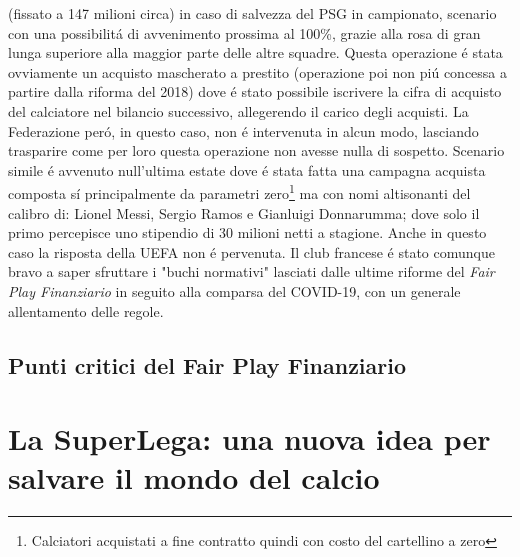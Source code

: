 \documentclass[
    corpo=12pt,
    oneside,
    evenboxes,
    tipotesi=triennale,
    stile=classica,
    oldstyle,
    autoretitolo,
    greek,
]{toptesi}
\begin{document}
\begin{interlinea}{1.5}
(fissato a 147 milioni circa) in caso di salvezza del PSG in campionato,
scenario con una possibilit\'a di avvenimento prossima al 100\%, grazie alla rosa di gran lunga superiore alla maggior parte delle altre squadre.
Questa operazione \'e stata ovviamente un acquisto mascherato a prestito (operazione poi non pi\'u concessa a partire dalla riforma del 2018) dove
\'e stato possibile iscrivere la cifra di acquisto del calciatore nel bilancio successivo, allegerendo il carico degli acquisti. La Federazione 
per\'o, in questo caso, non \'e intervenuta in alcun modo, lasciando trasparire come per loro questa operazione non avesse nulla di sospetto. 
Scenario simile \'e avvenuto null'ultima estate dove \'e stata fatta una campagna acquista composta s\'i principalmente da parametri zero\footnote{Calciatori acquistati a fine contratto quindi con costo del cartellino a zero}
ma con nomi altisonanti del calibro di: Lionel Messi, Sergio Ramos e Gianluigi Donnarumma; dove solo il primo percepisce uno stipendio di 30 milioni
netti a stagione. Anche in questo caso la risposta della UEFA non \'e pervenuta. Il club francese \'e stato comunque bravo a saper sfruttare
i "buchi normativi" lasciati dalle ultime riforme del \emph{Fair Play Finanziario} in seguito alla comparsa del COVID-19, con un generale
allentamento delle regole.
\section{Punti critici del Fair Play Finanziario}

\chapter{La SuperLega: una nuova idea per salvare il mondo del calcio}
\end{interlinea}
\end{document}
